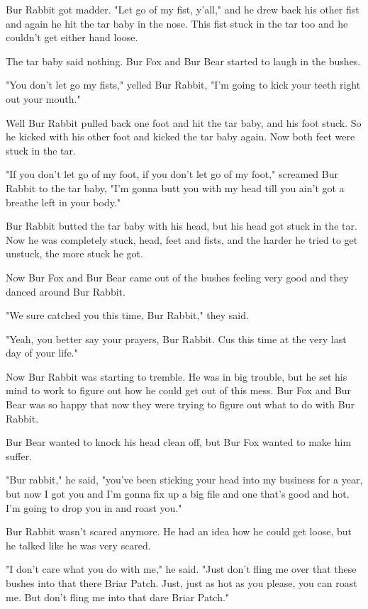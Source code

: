Bur Rabbit got madder. "Let go of my fist, y'all," and he drew back his other fist and again he hit the tar baby in the nose. This fist stuck in the tar too and he couldn't get either hand loose.

The tar baby said nothing. Bur Fox and Bur Bear started to laugh in the bushes.

"You don't let go my fists," yelled Bur Rabbit, "I'm going to kick your teeth right out your mouth."

Well Bur Rabbit pulled back one foot and hit the tar baby, and his foot stuck. So he kicked with his other foot and kicked the tar baby again. Now both feet were stuck in the tar.

"If you don't let go of my foot, if you don't let go of my foot," screamed Bur Rabbit to the tar baby, "I'm gonna butt you with my head till you ain't got a breathe left in your body."

Bur Rabbit butted the tar baby with his head, but his head got stuck in the tar. Now he was completely stuck, head, feet and fists, and the harder he tried to get unstuck, the more stuck he got.

Now Bur Fox and Bur Bear came out of the bushes feeling very good and they danced around Bur Rabbit.

"We sure catched you this time, Bur Rabbit," they said.

"Yeah, you better say your prayers, Bur Rabbit. Cus this time at the very last day of your life."

Now Bur Rabbit was starting to tremble. He was in big trouble, but he set his mind to work to figure out how he could get out of this mess. Bur Fox and Bur Bear was so happy that now they were trying to figure out what to do with Bur Rabbit.

Bur Bear wanted to knock his head clean off, but Bur Fox wanted to make him suffer.

"Bur rabbit," he said, "you've been sticking your head into my business for a year, but now I got you and I'm gonna fix up a big file and one that's good and hot. I'm going to drop you in and roast you."

Bur Rabbit wasn't scared anymore. He had an idea how he could get loose, but he talked like he was very scared.

"I don't care what you do with me," he said. "Just don't fling me over that these bushes into that there Briar Patch. Just, just as hot as you please, you can roast me. But don't fling me into that dare Briar Patch."

